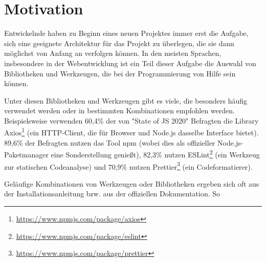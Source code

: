 \section{Motivation}
Entwickelnde haben zu Beginn eines neuen Projektes immer erst die Aufgabe, sich eine geeignete Architektur für das Projekt zu überlegen, die sie dann möglichst von Anfang an verfolgen können. In den meisten Sprachen, insbesondere in der Webentwicklung ist ein Teil dieser Aufgabe die Auswahl von Bibliotheken und Werkzeugen, die bei der Programmierung von Hilfe sein können.

Unter diesen Bibliotheken und Werkzeugen gibt es viele, die besonders häufig verwendet werden oder in bestimmten Kombinationen empfohlen werden. Beispielsweise verwenden 60,4\% der von "State of JS 2020" Befragten die Library Axios\footnote{\url{https://www.npmjs.com/package/axios}} (ein HTTP-Client, die für Browser und Node.js dasselbe Interface bietet)\cite{stateofjs}. 89,6\% der Befragten nutzen das Tool \gls{npm} (wobei dies als offizieller Node.js-Paketmanager eine Sonderstellung genießt), 82,3\% nutzen ESLint\footnote{\url{https://www.npmjs.com/package/eslint}} (ein Werkzeug zur statischen Codeanalyse) und 70,9\% nutzen Prettier\footnote{\url{https://www.npmjs.com/package/prettier}} (ein Codeformatierer).

Geläufige Kombinationen von Werkzeugen oder Bibliotheken ergeben sich oft aus der Installationsanleitung bzw. aus der offiziellen Dokumentation. So 